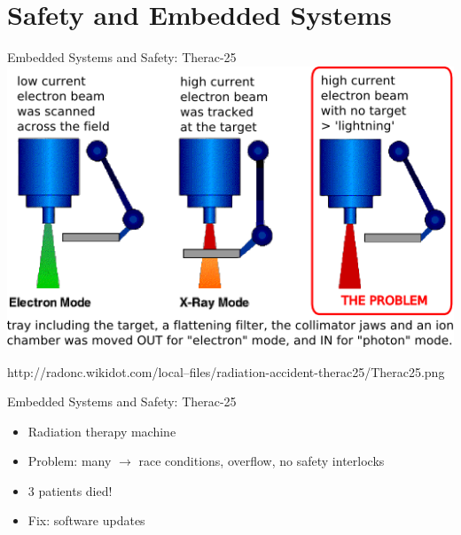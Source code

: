 \documentclass[aspectratio=169]{beamer}
\begin{document}
\section{Safety and Embedded Systems}	



\begin{frame}{Embedded Systems and Safety: Therac-25}
\centering
\includegraphics[width=0.65\linewidth,keepaspectratio]{img/Therac25.png}
\vspace{0.25em}
\begin{footnotesize}http://radonc.wikidot.com/local--files/radiation-accident-therac25/Therac25.png\end{footnotesize}
\end{frame} 



\begin{frame}{Embedded Systems and Safety: Therac-25}
  \begin{itemize}
  \item Radiation therapy machine
  \item Problem: \alert{many} $\rightarrow$ race conditions, overflow,
    no safety interlocks
  \item 3 patients died!
  \item Fix: software updates
  \end{itemize}



\end{frame}
\end{document}
